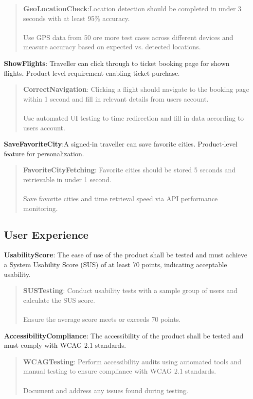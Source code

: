 \begin{quote}
    \textbf{GeoLocationCheck}:Location detection should be completed in under 3 seconds with at least 95\% accuracy.\\ \\
    Use GPS data from 50 ore more test cases across different devices and measure accuracy based on expected vs. detected locations.
\end{quote}
\textbf{ShowFlights}: Traveller can click through to ticket booking page for shown flights. Product-level requirement enabling ticket purchase.
    \begin{quote}
        \textbf{CorrectNavigation}: Clicking a flight should navigate to the booking page within 1 second and fill in relevant details from users account. \\ \\
        Use automated UI testing to time redirection and fill in data according to users account.
    \end{quote}
\textbf{SaveFavoriteCity}:A signed-in traveller can save favorite cities. Product-level feature for personalization.
\begin{quote}
    \textbf{FavoriteCityFetching}: Favorite cities should be stored 5 seconds and retrievable in under 1 second. \\ \\
    Save favorite cities and time retrieval speed via API performance monitoring.
\end{quote}

\subsection{User Experience}
\textbf{UsabilityScore}: The ease of use of the product shall be tested and must achieve a System Usability Score (SUS) of at least 70 points, indicating acceptable usability.
\begin{quote}
    \textbf{SUSTesting}: Conduct usability tests with a sample group of users and calculate the SUS score. \\ \\
    Ensure the average score meets or exceeds 70 points.
\end{quote}

\textbf{AccessibilityCompliance}: The accessibility of the product shall be tested and must comply with WCAG 2.1 standards.
\begin{quote}
    \textbf{WCAGTesting}: Perform accessibility audits using automated tools and manual testing to ensure compliance with WCAG 2.1 standards. \\ \\
    Document and address any issues found during testing.
\end{quote}

